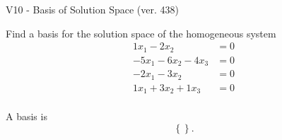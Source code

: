 \begin{exercise}
  \begin{exerciseTitle}V10 - Basis of Solution Space (ver. 438)\end{exerciseTitle}
  \begin{exerciseStatement}
    Find a basis for the solution space of the homogeneous system 
\begin{align*}
 1 x_ 1 -2 x_ 2 &= 0  \\ 
  -5 x_ 1 -6 x_ 2 -4 x_ 3 &= 0  \\ 
  -2 x_ 1 -3 x_ 2 &= 0  \\ 
  1 x_ 1 + 3 x_ 2 + 1 x_ 3 &= 0  \\ 
 \end{align*}


 
  \end{exerciseStatement}

  \begin{exerciseAnswer}
   A basis is   
\[\left\{\right\}.\]

  


  \end{exerciseAnswer}
\end{exercise}